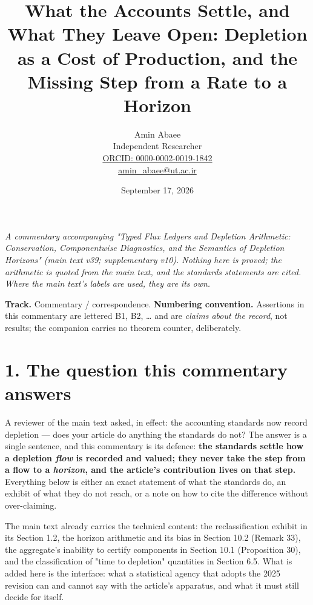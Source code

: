 \documentclass[11pt]{article}
\begin{document}
\title{What the Accounts Settle, and What They Leave Open: Depletion as a Cost of Production, and the Missing Step from a Rate to a Horizon}
\author{Amin Abaee\\[0.35em]
{\small Independent Researcher}\\[0.55em]
{\small\href{https://orcid.org/0000-0002-0019-1842}{ORCID: 0000-0002-0019-1842}}\\[0.3em]
{\small\href{mailto:amin\_abaee@ut.ac.ir}{amin\_abaee@ut.ac.ir}}}
\date{September 17, 2026}
\maketitle

\emph{A commentary accompanying "Typed Flux Ledgers and Depletion Arithmetic: Conservation, Componentwise Diagnostics, and the Semantics of Depletion Horizons" (main text v39; supplementary v10). Nothing here is proved; the arithmetic is quoted from the main text, and the standards statements are cited. Where the main text's labels are used, they are its own.}

\textbf{Track.} Commentary / correspondence. \textbf{Numbering convention.} Assertions in this commentary are lettered B1, B2, \ldots{} and are \emph{claims about the record}, not results; the companion carries no theorem counter, deliberately.

\vspace{0.8em}

\section*{1. The question this commentary answers}\label{1-the-question-this-commentary-answers}

A reviewer of the main text asked, in effect: the accounting standards now record depletion --- does your article do anything the standards do not? The answer is a single sentence, and this commentary is its defence: \textbf{the standards settle how a depletion \emph{flow} is recorded and valued; they never take the step from a flow to a \emph{horizon}, and the article's contribution lives on that step.} Everything below is either an exact statement of what the standards do, an exhibit of what they do not reach, or a note on how to cite the difference without over-claiming.

The main text already carries the technical content: the reclassification exhibit in its Section 1.2, the horizon arithmetic and its bias in Section 10.2 (Remark 33), the aggregate's inability to certify components in Section 10.1 (Proposition 30), and the classification of "time to depletion" quantities in Section 6.5. What is added here is the interface: what a statistical agency that adopts the 2025 revision can and cannot say with the article's apparatus, and what it must still decide for itself.
\end{document}
